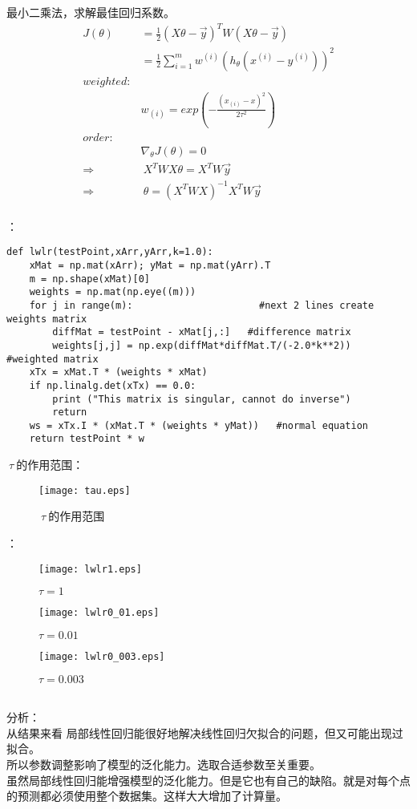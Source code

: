 最小二乘法，求解最佳回归系数。
\begin{equation}\nonumber
\begin{split}
 J(\theta)&=\frac{1}{2}(X\theta-\vec{y})^TW(X\theta-\vec{y})\\
         &=\frac{1}{2}\sum_{i=1}^{m}w^{(i)}(h_\theta(x^{(i)}-y^{(i)}))^2\\
   weighted:&\\
   &w_{(i)}=exp(-\frac{(x_{(i)}-x)^2}{2\tau^2})\\
   order:&\\
   &\nabla_\theta J(\theta)=0\\
   \Rightarrow&~X^TWX\theta=X^TW\vec{y}\\
   \Rightarrow&~\theta=(X^TWX)^{-1}X^TW\vec{y}\\
\end{split}
\end{equation}

：
\begin{lstlisting}
def lwlr(testPoint,xArr,yArr,k=1.0):
    xMat = np.mat(xArr); yMat = np.mat(yArr).T
    m = np.shape(xMat)[0]
    weights = np.mat(np.eye((m)))
    for j in range(m):                      #next 2 lines create weights matrix
        diffMat = testPoint - xMat[j,:]   #difference matrix
        weights[j,j] = np.exp(diffMat*diffMat.T/(-2.0*k**2))   #weighted matrix
    xTx = xMat.T * (weights * xMat)
    if np.linalg.det(xTx) == 0.0:
        print ("This matrix is singular, cannot do inverse")
        return
    ws = xTx.I * (xMat.T * (weights * yMat))   #normal equation
    return testPoint * w
\end{lstlisting}

$~\tau~$的作用范围：
\begin{figure}[!h]
  \centering
  \texttt{[image: tau.eps]}
  \caption{$~\tau~$的作用范围}
\end{figure}

：
\begin{figure}[!h]
  \centering
  \texttt{[image: lwlr1.eps]}
  \caption{$\tau=1$}
\end{figure}
\begin{figure}[!htb]
  \centering
  \texttt{[image: lwlr0\_01.eps]}
  \caption{$\tau=0.01$}
\end{figure}
\begin{figure}[!htb]
  \centering
  \texttt{[image: lwlr0\_003.eps]}
  \caption{$\tau=0.003$}
\end{figure}\\
分析：\\
从结果来看 局部线性回归能很好地解决线性回归欠拟合的问题，但又可能出现过拟合。\\
所以参数调整影响了模型的泛化能力。选取合适参数至关重要。\\
虽然局部线性回归能增强模型的泛化能力。但是它也有自己的缺陷。就是对每个点的预测都必须使用整个数据集。这样大大增加了计算量。\\

